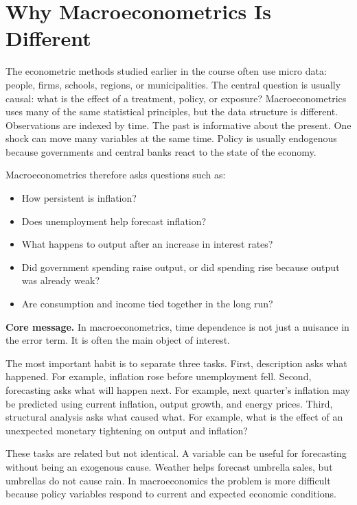 \section{Why Macroeconometrics Is Different}

The econometric methods studied earlier in the course often use micro data: people, firms, schools, regions, or municipalities. The central question is usually causal: what is the effect of a treatment, policy, or exposure? Macroeconometrics uses many of the same statistical principles, but the data structure is different. Observations are indexed by time. The past is informative about the present. One shock can move many variables at the same time. Policy is usually endogenous because governments and central banks react to the state of the economy.

Macroeconometrics therefore asks questions such as:
\begin{itemize}
    \item How persistent is inflation?
    \item Does unemployment help forecast inflation?
    \item What happens to output after an increase in interest rates?
    \item Did government spending raise output, or did spending rise because output was already weak?
    \item Are consumption and income tied together in the long run?
\end{itemize}

\begin{boxD}
\textbf{Core message.} In macroeconometrics, time dependence is not just a nuisance in the error term. It is often the main object of interest.
\end{boxD}

The most important habit is to separate three tasks. First, description asks what happened. For example, inflation rose before unemployment fell. Second, forecasting asks what will happen next. For example, next quarter's inflation may be predicted using current inflation, output growth, and energy prices. Third, structural analysis asks what caused what. For example, what is the effect of an unexpected monetary tightening on output and inflation?

These tasks are related but not identical. A variable can be useful for forecasting without being an exogenous cause. Weather helps forecast umbrella sales, but umbrellas do not cause rain. In macroeconomics the problem is more difficult because policy variables respond to current and expected economic conditions.

